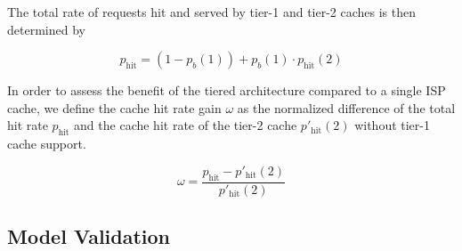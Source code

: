 The total rate of requests hit and served by tier-1 and tier-2 caches is then determined by

\begin{equation}
	p_\text{hit} = (1-p_b(1)) + p_b(1)\cdot p_\text{hit}(2)
\end{equation}

In order to assess the benefit of the tiered architecture compared to a single ISP cache, we define the cache hit rate gain $\omega$ as the normalized difference of the total hit rate $p_\text{hit}$ and the cache hit rate of the tier-2 cache $p'_\text{hit}(2)$ without tier-1 cache support.

\begin{equation}
\omega = \frac{p_\text{hit}-p'_\text{hit}(2)}{p'_\text{hit}(2)}
\end{equation}


\subsection{Model Validation}
